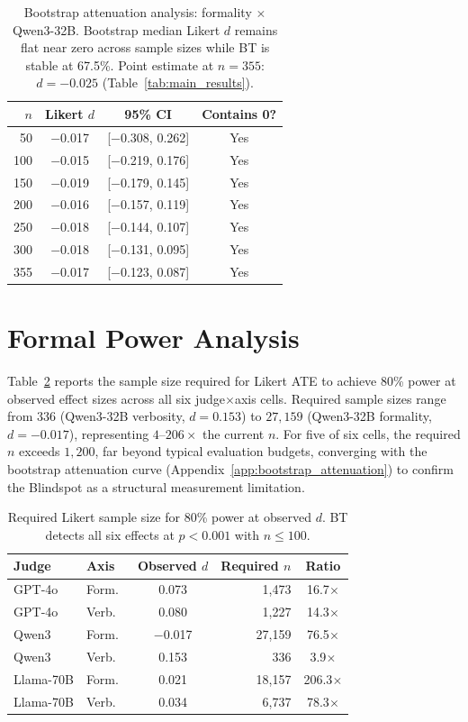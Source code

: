 \begin{table}[h]
\centering
\small
\caption{Bootstrap attenuation analysis: formality $\times$ Qwen3-32B. Bootstrap median Likert $d$ remains flat near zero across sample sizes while BT is stable at 67.5\%. Point estimate at $n = 355$: $d = {-}0.025$ (Table~\ref{tab:main_results}).}
\label{tab:attenuation}
\begin{tabular}{@{}rccc@{}}
\toprule
$n$ & Likert $d$ & 95\% CI & Contains 0? \\
\midrule
50 & $-$0.017 & [$-$0.308, 0.262] & Yes \\
100 & $-$0.015 & [$-$0.219, 0.176] & Yes \\
150 & $-$0.019 & [$-$0.179, 0.145] & Yes \\
200 & $-$0.016 & [$-$0.157, 0.119] & Yes \\
250 & $-$0.018 & [$-$0.144, 0.107] & Yes \\
300 & $-$0.018 & [$-$0.131, 0.095] & Yes \\
355 & $-$0.017 & [$-$0.123, 0.087] & Yes \\
\bottomrule
\end{tabular}
\end{table}

\section{Formal Power Analysis}
\label{app:power_analysis}

Table~\ref{tab:power} reports the sample size required for Likert ATE to achieve 80\% power at observed effect sizes across all six judge$\times$axis cells.
Required sample sizes range from $336$ (Qwen3-32B verbosity, $d = 0.153$) to $27{,}159$ (Qwen3-32B formality, $d = {-}0.017$), representing $4$--$206\times$ the current $n$.
For five of six cells, the required $n$ exceeds $1{,}200$, far beyond typical evaluation budgets, converging with the bootstrap attenuation curve (Appendix~\ref{app:bootstrap_attenuation}) to confirm the Blindspot as a structural measurement limitation.

\begin{table}[h]
\centering
\small
\caption{Required Likert sample size for 80\% power at observed $d$. BT detects all six effects at $p < 0.001$ with $n \leq 100$.}
\label{tab:power}
\begin{tabular}{@{}llcrc@{}}
\toprule
Judge & Axis & Observed $d$ & Required $n$ & Ratio \\
\midrule
GPT-4o & Form.\ & 0.073 & 1{,}473 & 16.7$\times$ \\
GPT-4o & Verb.\ & 0.080 & 1{,}227 & 14.3$\times$ \\
Qwen3 & Form.\ & $-$0.017 & 27{,}159 & 76.5$\times$ \\
Qwen3 & Verb.\ & 0.153 & 336 & 3.9$\times$ \\
Llama-70B & Form.\ & 0.021 & 18{,}157 & 206.3$\times$ \\
Llama-70B & Verb.\ & 0.034 & 6{,}737 & 78.3$\times$ \\
\bottomrule
\end{tabular}
\end{table}

